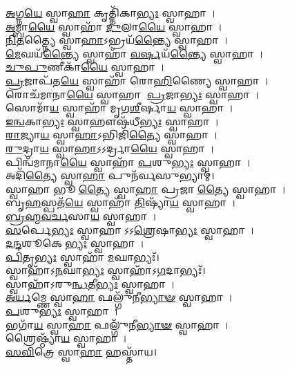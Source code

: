 \-\ul{𑌅}\-𑌗𑍍𑌨\-\ul{𑌯𑍇} 𑌸𑍍𑌵𑌾\-\ul{𑌹𑌾} 𑌕𑍃𑌤𑍍𑌤𑌿᳴𑌕𑌾\-\ul{𑌭𑍍𑌯𑌃} 𑌸𑍍𑌵𑌾𑌹𑌾।\\
\-\ul{𑌅}\-𑌮𑍍𑌬𑌾\-\ul{𑌯𑍈} 𑌸𑍍𑌵𑌾𑌹𑌾᳴ \ul{𑌦𑍁}\-𑌲𑌾\-\ul{𑌯𑍈} 𑌸𑍍𑌵𑌾𑌹𑌾।\\
\-\ul{𑌨𑌿}\-\-\ul{𑌤}\-𑌤𑍍𑌨𑍍𑌯𑍈 𑌸𑍍𑌵𑌾\-\ul{𑌹𑌾}\-𑌽𑌭𑍍𑌰𑌯᳴\-\ul{𑌨𑍍𑌤𑍍𑌯𑍈} 𑌸𑍍𑌵𑌾𑌹𑌾।\\
\-\ul{𑌮𑍇}\-𑌘𑌯᳴\-\ul{𑌨𑍍𑌤𑍍𑌯𑍈} 𑌸𑍍𑌵𑌾𑌹𑌾᳴ \ul{𑌵}\-\-\ul{𑌰𑍍𑌷}\-𑌯᳴\-\ul{𑌨𑍍𑌤𑍍𑌯𑍈} 𑌸𑍍𑌵𑌾𑌹𑌾।\\
\-\ul{𑌚𑍁}\-\-\ul{𑌪𑍁}\-𑌣𑍀𑌕𑌾᳴\-\ul{𑌯𑍈} 𑌸𑍍𑌵𑌾𑌹𑌾।\\
\-\ul{𑌪𑍍𑌰}\-𑌜𑌾𑌪᳴𑌤\-\ul{𑌯𑍇} 𑌸𑍍𑌵𑌾𑌹𑌾᳴ 𑌰𑍋\-\ul{𑌹𑌿}\-𑌣𑍍𑌯𑍈 𑌸𑍍𑌵𑌾𑌹𑌾।\\
𑌰𑍋𑌚᳴𑌮𑌾𑌨𑌾\-\ul{𑌯𑍈} 𑌸𑍍𑌵𑌾𑌹𑌾 \ul{𑌪𑍍𑌰}\-𑌜𑌾\-\ul{𑌭𑍍𑌯𑌃} 𑌸𑍍𑌵𑌾𑌹𑌾।\\
𑌸𑍋𑌮𑌾᳴\-\ul{𑌯} 𑌸𑍍𑌵𑌾𑌹𑌾᳴ 𑌮𑍃𑌗\-\ul{𑌶𑍀}\-𑌰𑍍𑌷𑌾\-\ul{𑌯} 𑌸𑍍𑌵𑌾𑌹𑌾।\\
\-\ul{𑌇}\-\-\ul{𑌨𑍍𑌵}\-𑌕𑌾\-\ul{𑌭𑍍𑌯𑌃} 𑌸𑍍𑌵𑌾𑌹𑍗𑌷᳴𑌧𑍀\-\ul{𑌭𑍍𑌯𑌃} 𑌸𑍍𑌵𑌾𑌹𑌾।\\
\-\ul{𑌰𑌾}\-𑌜𑍍𑌯𑌾\-\ul{𑌯} 𑌸𑍍𑌵𑌾\-\ul{𑌹𑌾}\-𑌽𑌭𑌿𑌜𑌿᳴\-\ul{𑌤𑍍𑌯𑍈} 𑌸𑍍𑌵𑌾𑌹𑌾।\\
\-\ul{𑌰𑍁}\-𑌦𑍍𑌰𑌾\-\ul{𑌯} 𑌸𑍍𑌵𑌾\-\ul{𑌹𑌾}\-𑌽𑌽𑌰𑍍𑌦𑍍𑌰𑌾\-\ul{𑌯𑍈} 𑌸𑍍𑌵𑌾𑌹𑌾।\\
𑌪𑌿𑌨𑍍𑌵᳴𑌮𑌾𑌨𑌾\-\ul{𑌯𑍈} 𑌸𑍍𑌵𑌾𑌹𑌾᳴ \ul{𑌪}\-𑌶𑍁\-\ul{𑌭𑍍𑌯𑌃} 𑌸𑍍𑌵𑌾𑌹𑌾।\\
𑌅𑌦𑌿᳴\-\ul{𑌤𑍍𑌯𑍈} 𑌸𑍍𑌵𑌾\-\ul{𑌹𑌾} 𑌪𑍁𑌨᳴𑌰𑍍𑌵𑌸𑍁𑌭𑍍𑌯𑌾𑌮𑍍।\\
𑌸𑍍𑌵𑌾𑌹𑌾 𑌭𑍂\-\ul{𑌤𑍍𑌯𑍈} 𑌸𑍍𑌵𑌾\-\ul{𑌹𑌾} 𑌪𑍍𑌰𑌜𑌾\-\ul{𑌤𑍍𑌯𑍈} 𑌸𑍍𑌵𑌾𑌹𑌾।\\
𑌬𑍃\-\ul{𑌹}\-𑌸𑍍𑌪𑌤᳴\-\ul{𑌯𑍇} 𑌸𑍍𑌵𑌾𑌹𑌾᳴ \ul{𑌤𑌿}\-𑌷𑍍𑌯𑌾᳴\-\ul{𑌯} 𑌸𑍍𑌵𑌾𑌹𑌾।\\
\-\ul{𑌬𑍍𑌰}\-\-\ul{𑌹𑍍𑌮}\-\-\ul{𑌵}\-\-\ul{𑌰𑍍𑌚}\-𑌸𑌾\-\ul{𑌯} 𑌸𑍍𑌵𑌾𑌹𑌾।\\
\-\ul{𑌸}\-𑌰𑍍𑌪𑍇\-\ul{𑌭𑍍𑌯𑌃} 𑌸𑍍𑌵𑌾𑌹𑌾𑌽𑌽\-\ul{𑌶𑍍𑌰𑍇}\-𑌷𑌾\-\ul{𑌭𑍍𑌯𑌃} 𑌸𑍍𑌵𑌾𑌹𑌾।\\
\-\ul{𑌦}\-\-\ul{𑌨𑍍𑌦}\-𑌶𑍂𑌕𑍇\-\ul{𑌭𑍍𑌯𑌃} 𑌸𑍍𑌵𑌾𑌹𑌾।\\
\-\ul{𑌪𑌿}\-𑌤𑍃\-\ul{𑌭𑍍𑌯𑌃} 𑌸𑍍𑌵𑌾𑌹𑌾᳴ \ul{𑌮}\-𑌘𑌾𑌭𑍍𑌯𑌃᳴।\\
𑌸𑍍𑌵𑌾𑌹𑌾᳴𑌽\-\ul{𑌨}\-𑌘𑌾\-\ul{𑌭𑍍𑌯𑌃} 𑌸𑍍𑌵𑌾𑌹𑌾᳴𑌽\-\ul{𑌗}\-𑌦𑌾𑌭𑍍𑌯𑌃᳴।\\
𑌸𑍍𑌵𑌾𑌹𑌾᳴𑌽𑌰𑍁\-\ul{𑌨𑍍𑌧}\-𑌤𑍀\-\ul{𑌭𑍍𑌯𑌃} 𑌸𑍍𑌵𑌾𑌹𑌾।\\
\-\ul{𑌅}\-\-\ul{𑌰𑍍𑌯}\-𑌮𑍍𑌣𑍇 𑌸𑍍𑌵𑌾\-\ul{𑌹𑌾} 𑌫𑌲𑍍𑌗𑍁᳴𑌨𑍀\-\ul{𑌭𑍍𑌯𑌾}\-\-\ul{𑍟} 𑌸𑍍𑌵𑌾𑌹𑌾।\\
\-\ul{𑌪}\-𑌶𑍁\-\ul{𑌭𑍍𑌯𑌃} 𑌸𑍍𑌵𑌾𑌹𑌾।\\
𑌭𑌗𑌾᳴\-\ul{𑌯} 𑌸𑍍𑌵𑌾\-\ul{𑌹𑌾} 𑌫𑌲𑍍𑌗𑍁᳴𑌨𑍀\-\ul{𑌭𑍍𑌯𑌾}\-\-\ul{𑍟} 𑌸𑍍𑌵𑌾𑌹𑌾।\\
𑌶𑍍𑌰𑍈𑌷𑍍𑌠𑍍𑌯𑌾᳴\-\ul{𑌯} 𑌸𑍍𑌵𑌾𑌹𑌾।\\
\-\ul{𑌸}\-\-\ul{𑌵𑌿}\-𑌤𑍍𑌰𑍇 𑌸𑍍𑌵𑌾\-\ul{𑌹𑌾} 𑌹𑌸𑍍𑌤𑌾᳴𑌯।\\
